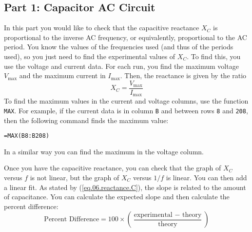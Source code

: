 \subsection{Part 1: Capacitor AC Circuit}
In this part you would like to check that the capacitive reactance $X_{C}$ is proportional to the inverse AC frequency, or equivalently, proportional to the AC period. You know the values of the frequencies used (and thus of the periods used), so you just need to find the experimental values of $X_{C}$. To find this, you use the voltage and current data. For each run, you find the maximum voltage $V_{\text{max}}$ and the maximum current in $I_{\text{max}}$. Then, the reactance is given by the ratio
\begin{equation}
	X_{C} = \frac{V_{\text{max}}}{I_{\text{max}}}
\end{equation}
To find the maximum values in the current and voltage columns, use the function \texttt{MAX}. For example, if the current data is in column \texttt{B} and between rows \texttt{8} and \texttt{208}, then the following command finds the maximum value:
\begin{center}
	\texttt{=MAX(B8:B208)}
\end{center}
In a similar way you can find the maximum in the voltage column.

Once you have the capacitive reactance, you can check that the graph of $X_{C}$ versus $f$ is not linear, but the graph of $X_{C}$ versus $1/f$ is linear. You can then add a linear fit. As stated by (\ref{eq.06.reactance.C}), the slope is related to the amount of capacitance. You can calculate the expected slope and then calculate the percent difference:
\begin{equation}
	\text{Percent Difference} = 100 \times \left( \frac{\text{experimental } - \text{ theory}}{\text{theory}} \right)
\end{equation}
